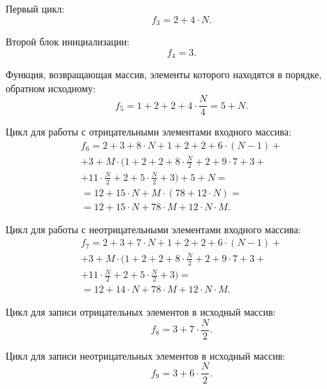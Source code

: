 Первый цикл:
\begin{equation}
f_3 = 2 + 4 \cdot N.
\end{equation}

Второй блок инициализации:
\begin{equation}
f_4 = 3.
\end{equation}

Функция, возвращающая массив, элементы которого находятся в порядке, обратном исходному:
\begin{equation}
f_5 = 1 + 2 + 2 + 4 \cdot \frac{N}{4} = 5 + N.
\end{equation}

Цикл для работы с отрицательными элементами входного массива:
\begin{equation}
\begin{gathered}
f_6 = 2 + 3 + 8 \cdot N + 1 + 2 + 2 + 6 \cdot (N - 1) + \\ + 3 + M \cdot (1 + 2 + 2 + 8 \cdot \frac{N}{2} + 2 + 9 \cdot 7 + 3 + \\ + 11 \cdot \frac{N}{2} + 2 + 5 \cdot \frac{N}{2} + 3) + 5 + N = \\ = 12 + 15 \cdot N + M \cdot (78 + 12 \cdot N) = \\ = 12 + 15 \cdot N + 78 \cdot M + 12 \cdot N \cdot M.
\end{gathered}
\end{equation}

Цикл для работы с неотрицательными элементами входного массива:
\begin{equation}
\begin{gathered}
f_7 = 2 + 3 + 7 \cdot N + 1 + 2 + 2 + 6 \cdot (N - 1) + \\ + 3 + M \cdot (1 + 2 + 2 + 8 \cdot \frac{N}{2} + 2 + 9 \cdot 7 + 3 + \\ + 11 \cdot \frac{N}{2} + 2 + 5 \cdot \frac{N}{2} + 3) = \\ = 12 + 14 \cdot N + 78 \cdot M + 12 \cdot N \cdot M.
\end{gathered}
\end{equation}

Цикл для записи отрицательных элементов в исходный массив:
\begin{equation}
f_8 = 3 + 7 \cdot \frac{N}{2}.
\end{equation}

Цикл для записи неотрицательных элементов в исходный массив:
\begin{equation}
f_9 = 3 + 6 \cdot \frac{N}{2}.
\end{equation}

